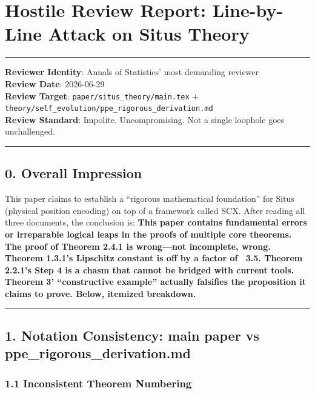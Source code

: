 \documentclass[
  12pt,
]{article}
\author{SCX}
\date{2026}
\begin{document}
\section{Hostile Review Report: Line-by-Line Attack on Situs Theory}\label{hostile-review}

\begin{center}\rule{0.5\linewidth}{0.5pt}\end{center}

\textbf{Reviewer Identity}: Annals of Statistics' most demanding reviewer\\
\textbf{Review Date}: 2026-06-29\\
\textbf{Review Target}: \texttt{paper/situs\_theory/main.tex} +
\texttt{theory/self\_evolution/ppe\_rigorous\_derivation.md}\\
\textbf{Review Standard}: Impolite. Uncompromising. Not a single loophole goes unchallenged.

\begin{center}\rule{0.5\linewidth}{0.5pt}\end{center}

\subsection{0. Overall Impression}\label{overall-impression}

This paper claims to establish a ``rigorous mathematical foundation'' for Situs (physical position encoding) on top of a framework called SCX. After reading all three documents, the conclusion is: \textbf{This paper contains fundamental errors or irreparable logical leaps in the proofs of multiple core theorems. The proof of Theorem 2.4.1 is wrong---not incomplete, wrong. Theorem 1.3.1's Lipschitz constant is off by a factor of ~3.5. Theorem 2.2.1's Step 4 is a chasm that cannot be bridged with current tools. Theorem 3' ``constructive example'' actually falsifies the proposition it claims to prove. Below, itemized breakdown.}

\begin{center}\rule{0.5\linewidth}{0.5pt}\end{center}

\subsection{1. Notation Consistency: main paper vs ppe\_rigorous\_derivation.md}\label{notation-consistency}

\subsubsection{1.1 Inconsistent Theorem Numbering}\label{inconsistent-theorem-numbering}
\end{document}
